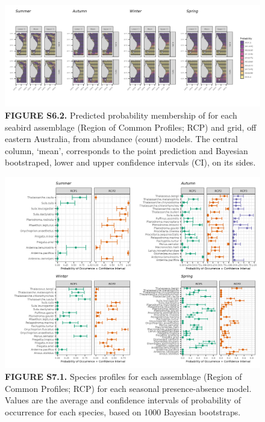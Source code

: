 \documentclass[
]{article}
\begin{document}
\begin{landscape}
\newpage

\begin{figure}
\centering
\includegraphics{../results/FigS5_2_prob-pred-NegBin.png}
\caption{\textbf{FIGURE S6.2.} Predicted probability membership of for
each seabird assemblage (Region of Common Profiles; RCP) and grid, off
eastern Australia, from abundance (count) models. The central column,
`mean', corresponds to the point prediction and Bayesian bootstraped,
lower and upper confidence intervals (CI), on its sides.}
\end{figure}

\newpage

\begin{figure}
\centering
\includegraphics{../results/FigS7_1_spp-profiles-Bernoulli.png}
\caption{\textbf{FIGURE S7.1.} Species profiles for each assemblage
(Region of Common Profiles; RCP) for each seasonal presence-absence
model. Values are the average and confidence intervals of probability of
occurrence for each species, based on 1000 Bayesian bootstraps.}
\end{figure}


\end{landscape}
\end{document}

